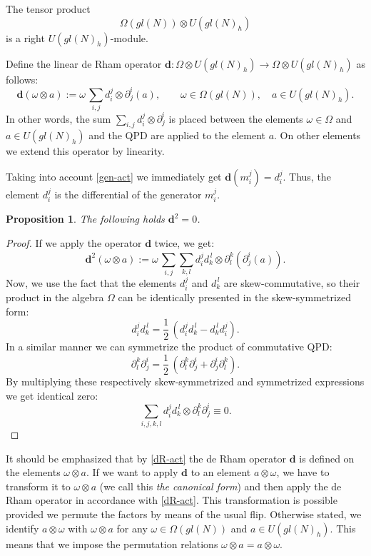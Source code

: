 \documentclass[11pt]{article}
\newcommand{\pa}{\partial}
\newcommand{\ot}{\otimes}
\newcommand{\UU}{U(gl(N)_h)}
\newcommand{\Om}{\Omega}
\newcommand{\om}{\omega}
\newcommand{\dd}{\mathbf{d}}
\numberwithin{equation}{section}
\theoremstyle{plain}
\newtheorem{proposition}[theorem]{Proposition}
\theoremstyle{definition}
\begin{document}
The tensor product
\begin{equation}
\Om(gl(N))\ot U(gl(N)_h) \label{produc}
\end{equation}
is a right $U(gl(N)_h)$-module.

Define the linear de Rham operator $\dd: \Omega\otimes U(gl(N)_h)\rightarrow \Omega\otimes U(gl(N)_h)$ as
follows:
\begin{equation}
\dd(\om\ot a):= \om\, \sum_{i, j} d_i^j\ot \pa_j^i(a),\qquad \om\in \Om(gl(N)),\quad a\in \UU.
\label{dR-act}
\end{equation}
In other words, the sum $\sum_{i, j} d_i^j\ot \pa_j^i$ is placed  between the elements $\om\in \Om$ and $a\in U(gl(N)_h)$ and  the
QPD are applied to the  element $a$. On other elements we extend this operator by linearity. 

Taking into account \eqref{gen-act} we immediately get $\dd(m_i^j)= d_i^j$. Thus, the element $d_i^j$ is  the differential of the
generator $m_i^j$.

\begin{proposition}
The following holds $ \dd^2=0$.
\end{proposition}

\begin{proof}
If we apply the operator $\dd$ twice, we get:
\[
\dd^2(\om\ot a):=  \om\, \sum_{i, j} \sum_{k, l}d_i^j d_k^{\,l} \ot \pa_l^k(\pa_j^i(a)).
\]
Now, we use the fact that the elements $d_i^j$ and $d_k^{\,l}$ are skew-commutative, so their product in the algebra $\Om$ can
be identically presented in the skew-symmetrized form:
\[
d_i^jd_k^{\,l} = \frac{1}{2}\,(d_i^jd_k^{\,l}-d_k^{\,l}d_i^j).
\]
In a similar manner we can symmetrize the product of commutative QPD:
\[
\pa_l^k\pa_j^i = \frac{1}{2}\,(\pa_l^k\pa_j^i+\pa_j^i \pa_l^k).
\]
By multiplying these respectively skew-symmetrized and symmetrized expressions we get identical zero:
\[
\sum_{i,j,k,l}
d_i^j d_k^{\,l} \ot \pa_l^k\pa_j^i\equiv 0.
\]
\end{proof}

It should be emphasized that by \eqref{dR-act} the de Rham operator $\dd$ is defined on the elements $\om \ot a$. If we want to apply
$\dd$ to an element $a\ot \om$, we have to transform it to $\om \ot a$ (we call this {\em the canonical form}) and then apply
the de Rham operator in accordance with \eqref{dR-act}. This transformation is possible provided we permute the factors by means
of the usual flip. Otherwise stated, we identify $a\otimes \omega$ with $\omega\otimes a $ for any $\om\in \Om(gl(N))$ and
$a\in  U(gl(N)_h)$. This means that we impose the permutation relations $\om\ot a=a\ot\om$.
\end{document}
